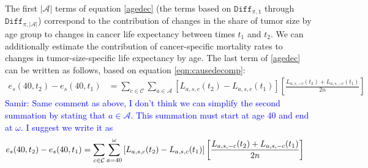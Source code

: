 \documentclass[11pt,letterpaper]{article}
\theoremstyle{plain}
\theoremstyle{remark}
\numberwithin{equation}{section}
\begin{document}
The first $\left\vert\mathcal{A}\right\vert$ terms of equation
\eqref{agedec} (the terms based on $\mathtt{Diff_{\pi,1}}$ through
$\mathtt{Diff_{\pi,{\left\vert\mathcal{A}\right\vert}}}$) correspond
to the contribution of changes in the share of tumor size by age group
to changes in cancer life expectancy between times $t_1$ and $t_2$. We
can additionally estimate the contribution of cancer-specific
mortality rates to changes in tumor-size-specific life expectancy by
age. The last term of \eqref{agedec} can be written as follows, based
on equation \eqref{eqn:causedecomp}:
%
\begin{align}
  e_s(40,t_2)-e_s(40,t_1)&=\sum_{c\in\mathcal{C}} \sum_{a\in\mathcal{A}}\left[L_{a,s,c}(t_2)-L_{a,s,c}(t_1) \right] \left[\frac{L_{a,s,-c}(t_2)+L_{a,s,-c}(t_1) }{2n} \right] 
\end{align}
\textcolor{blue}{Samir: Same comment as above, I don't think we can simplify the second summation by stating that $a\in\mathcal{A}$. This summation must start at age 40 and end at $\omega$.  I suggest we write it as  
\begin{align}
  e_s(40,t_2)-e_s(40,t_1)&=\sum_{c\in\mathcal{C}} \sum_{a=40}^\omega\left[L_{a,s,c}(t_2)-L_{a,s,c}(t_1) \right] \left[\frac{L_{a,s,-c}(t_2)+L_{a,s,-c}(t_1) }{2n} \right]  \notag
\end{align} }
\end{document}
